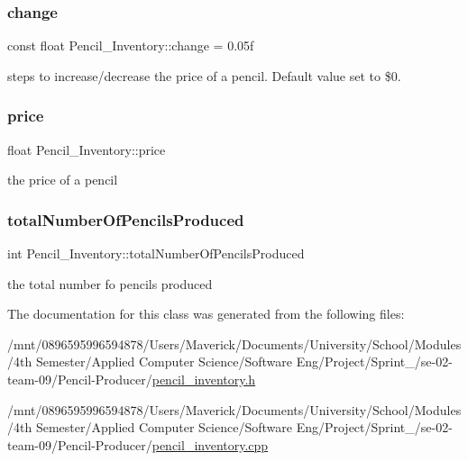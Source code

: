 \subsubsection{\texorpdfstring{change}{change}}
{\footnotesize\ttfamily const float Pencil\+\_\+\+Inventory\+::change = 0.\+05f\hspace{0.3cm}{\ttfamily [private]}}

steps to increase/decrease the price of a pencil. Default value set to \$0. \mbox{\label{classPencil__Inventory_a833632ab57afc00b148d106c43a6729e}} 
\subsubsection{\texorpdfstring{price}{price}}
{\footnotesize\ttfamily float Pencil\+\_\+\+Inventory\+::price\hspace{0.3cm}{\ttfamily [private]}}



the price of a pencil 

\mbox{\label{classPencil__Inventory_ac7f37f56e5e1a630cf24e436aac27cee}} 
\subsubsection{\texorpdfstring{total\+Number\+Of\+Pencils\+Produced}{totalNumberOfPencilsProduced}}
{\footnotesize\ttfamily int Pencil\+\_\+\+Inventory\+::total\+Number\+Of\+Pencils\+Produced\hspace{0.3cm}{\ttfamily [private]}}



the total number fo pencils produced 



The documentation for this class was generated from the following files\+:\begin{DoxyCompactItemize}
\item 
/mnt/0896595996594878/\+Users/\+Maverick/\+Documents/\+University/\+School/\+Modules/4th Semester/\+Applied Computer Science/\+Software Eng/\+Project/\+Sprint\+\_/se-\/02-\/team-\/09/\+Pencil-\/\+Producer/\hyperlink{pencil__inventory_8h}{pencil\+\_\+inventory.\+h}\item 
/mnt/0896595996594878/\+Users/\+Maverick/\+Documents/\+University/\+School/\+Modules/4th Semester/\+Applied Computer Science/\+Software Eng/\+Project/\+Sprint\+\_/se-\/02-\/team-\/09/\+Pencil-\/\+Producer/\hyperlink{pencil__inventory_8cpp}{pencil\+\_\+inventory.\+cpp}\end{DoxyCompactItemize}
